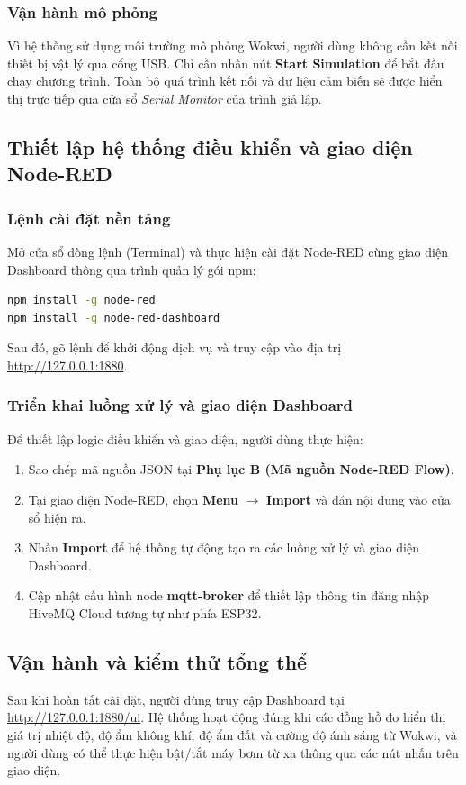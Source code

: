 \documentclass[12pt, a4paper]{article}
\newcommand{\code}[1]{\texttt{\detokenize{#1}}}
\begin{document}
\subsubsection{Vận hành mô phỏng}
Vì hệ thống sử dụng môi trường mô phỏng Wokwi, người dùng không cần kết nối thiết bị vật lý qua cổng USB. Chỉ cần nhấn nút \textbf{Start Simulation} để bắt đầu chạy chương trình. Toàn bộ quá trình kết nối và dữ liệu cảm biến sẽ được hiển thị trực tiếp qua cửa sổ \textit{Serial Monitor} của trình giả lập.

\subsection{Thiết lập hệ thống điều khiển và giao diện Node-RED}

\subsubsection{Lệnh cài đặt nền tảng}
Mở cửa sổ dòng lệnh (Terminal) và thực hiện cài đặt Node-RED cùng giao diện Dashboard thông qua trình quản lý gói npm:
\begin{lstlisting}[language=bash, basicstyle=\ttfamily\small, frame=none, numbers=none]
npm install -g node-red
npm install -g node-red-dashboard
\end{lstlisting}
Sau đó, gõ lệnh \code{node-red} để khởi động dịch vụ và truy cập vào địa trị \url{http://127.0.0.1:1880}.

\subsubsection{Triển khai luồng xử lý và giao diện Dashboard}
Để thiết lập logic điều khiển và giao diện, người dùng thực hiện:
\begin{enumerate}
    \item Sao chép mã nguồn JSON tại \textbf{Phụ lục B (Mã nguồn Node-RED Flow)}.
    \item Tại giao diện Node-RED, chọn \textbf{Menu} $\rightarrow$ \textbf{Import} và dán nội dung vào cửa sổ hiện ra.
    \item Nhấn \textbf{Import} để hệ thống tự động tạo ra các luồng xử lý và giao diện Dashboard.
    \item Cập nhật cấu hình node \textbf{mqtt-broker} để thiết lập thông tin đăng nhập HiveMQ Cloud tương tự như phía ESP32.
\end{enumerate}

\subsection{Vận hành và kiểm thử tổng thể}
Sau khi hoàn tất cài đặt, người dùng truy cập Dashboard tại \url{http://127.0.0.1:1880/ui}. Hệ thống hoạt động đúng khi các đồng hồ đo hiển thị giá trị nhiệt độ, độ ẩm không khí, độ ẩm đất và cường độ ánh sáng từ Wokwi, và người dùng có thể thực hiện bật/tắt máy bơm từ xa thông qua các nút nhấn trên giao diện.
\end{document}
